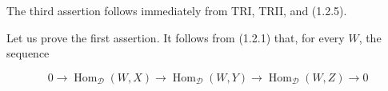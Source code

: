 The third assertion follows immediately from TRI, TRII, and (1.2.5).

Let us prove the first assertion. It follows from (1.2.1) that, for every
$W$, the sequence

\begin{equation}
  0\longrightarrow\operatorname{Hom}_{\mathcal D}(W,X)
  \longrightarrow\operatorname{Hom}_{\mathcal D}(W,Y)
  \longrightarrow\operatorname{Hom}_{\mathcal D}(W,Z)
  \longrightarrow0
  \tag{1.2.6.2}
\end{equation}
\endgroup
